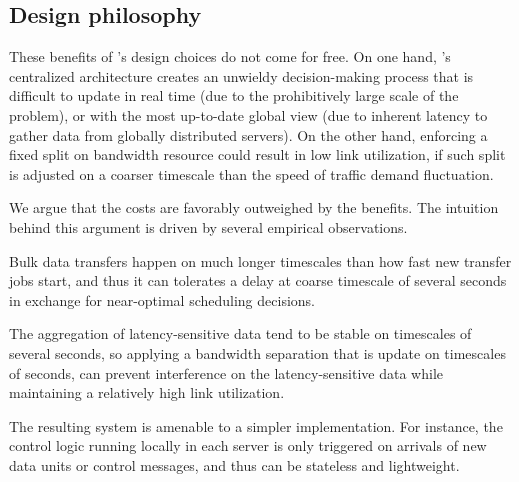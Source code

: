 \subsection{Design philosophy}

These benefits of \name's design choices do not come for free.
On one hand, \name's centralized architecture creates an unwieldy
decision-making process that is difficult to update in real time
(due to the prohibitively large scale of the problem),
or with the most up-to-date global view (due to inherent latency
to gather data from globally distributed servers).
On the other hand, enforcing a fixed split on bandwidth resource
could result in low link utilization, if such split is adjusted on
a coarser timescale than the speed of traffic demand fluctuation.



We argue that the costs are favorably outweighed by the
benefits. The intuition behind this argument
is driven by several empirical observations.
\begin{packedenumerate}
\item Bulk data transfers happen on much longer timescales than
how fast new transfer jobs start, and thus it can tolerates a delay
at coarse timescale of several seconds in exchange for near-optimal
scheduling decisions.
\item The aggregation of latency-sensitive data tend to be stable
on timescales of several seconds, so applying a bandwidth separation
that is update on timescales of seconds, can prevent interference on
the latency-sensitive data while maintaining a relatively
high link utilization.
\item The resulting system is amenable to a simpler implementation.
For instance, the control logic running locally in each server
is only triggered on arrivals of new data units or control messages,
and thus can be stateless and lightweight.
\end{packedenumerate}

